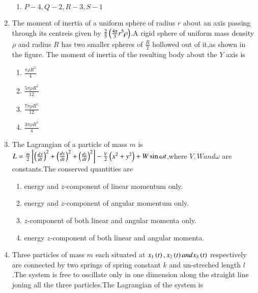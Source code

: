 \documentclass[journal]{IEEEtran}
\begin{document}
\begin{enumerate}[start=18]
\begin{enumerate}
        \item $P-4,Q-2,R-3,S-1$
     \end{enumerate}
     \item The moment of inertia of a uniform sphere of radius $r$ about an axis passing through its centreis given by $\frac{2}{5}\left(\frac{4\pi}{3}r^5\rho\right)$.A rigid sphere of uniform mass density $\rho$ and radius $R$ has two smaller spheres of $\frac{R}{2}$ hollowed out of it,as shown in the figure. The moment of inertia of the resulting body about the $Y$ axis is
     
     \begin{enumerate}
         \item $\frac{\pi \rho R^5}{4}$
         \item $\frac{5\pi \rho R^5}{12}$
         \item $\frac{7\pi \rho R^5}{12}$
         \item $\frac{3\pi \rho R^5}{4}$
     \end{enumerate}
     \item The Lagrangian of a particle of mass $m$ is $L=\frac{m}{2}{}\left[\left(\frac{dx}{dt}\right)^2+\left(\frac{dy}{dt}\right)^2+\left(\frac{dz}{dt}\right)^2\right]-\frac{V}{2}\left(x^2+y^2\right)+W\sin{\omega t}$,where $V,W and \omega$ are constants.The conserved quantities are
     \begin{enumerate}
         \item energy and $z$-component of linear momentum only.
         \item  energy and $z$-component of angular
         momentum only.
         \item $z$-component of both linear and angular momenta only.
         \item energy $z$-component of both linear and angular momenta.
     \end{enumerate}
     \item Three particles of mass $m$ each situated at $x_{1}\left(t\right),x_{2}\left(t\right)and x_{3}\left(t\right)$ respectively are connected by two springs of spring constant $k$ and un-streched length $l$.The system is free to oscillate only in one dimension along the straight line joning all the three particles.The Lagrangian of the system is
\end{enumerate}
\end{document}
